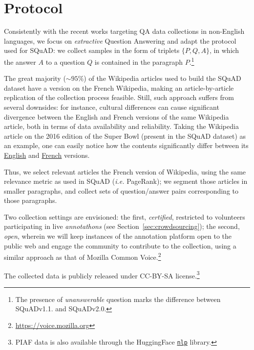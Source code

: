 \documentclass[10pt, a4paper]{article}
\begin{document}
\section{Protocol}
\label{sec:Protocol}

Consistently with the recent works targeting QA data collections in non-English languages, we focus on \emph{extractive} Question Answering and adapt the protocol used for SQuAD: we collect samples in the form of triplets \emph{$\{P, Q, A\}$}, in which the answer $A$ to a question $Q$ is contained in the paragraph $P$.\footnote{The presence of \emph{unanswerable} question marks the difference between SQuADv1.1. and SQuADv2.0.}

The great majority ($\sim 95\%$) of the Wikipedia articles used to build the SQuAD dataset have a version on the French Wikipedia, making an article-by-article replication of the collection process feasible. Still, such approach suffers from several downsides: for instance, cultural differences can cause significant divergence between the English and French versions of the same Wikipedia article, both in terms of data availability and reliability. Taking the Wikipedia article on the 2016 edition of the Super Bowl (present in the SQuAD dataset) as an example, one can easily notice how the contents significantly differ between its \href{https://en.wikipedia.org/wiki/Super_Bowl_50}{English} and \href{https://en.wikipedia.org/wiki/Super_Bowl_50}{French} versions.

Thus, we select relevant articles the French version of Wikipedia, using the same relevance metric as used in SQuAD (\emph{i.e.} PageRank); we segment those articles in smaller paragraphs, and collect sets of question/answer pairs corresponding to those paragraphs.

Two collection settings are envisioned: the first, \emph{certified}, restricted to volunteers participating in live \emph{annotathons} (see Section~\ref{sec:crowdsourcing}); the second, \emph{open}, wherein we will keep instances of the annotation platform open to the public web and engage the community to contribute to the collection, using a similar approach as that of Mozilla Common Voice.\footnote{\url{https://voice.mozilla.org}}


The collected data is publicly released under CC-BY-SA license.\footnote{PIAF data is also available through the HuggingFace \href{https://github.com/huggingface/nlp}{\texttt{nlp}} library.}
\end{document}
